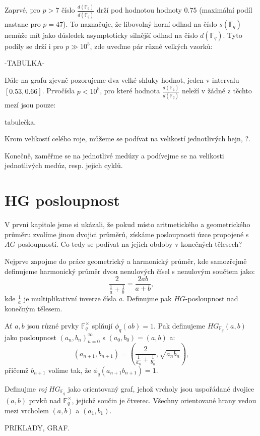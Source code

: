 \documentclass[12pt]{report}
\begin{document}
Zaprvé, pro $p>7$ číslo $\frac{d(\mathbb{F_q})}{d(\mathbb{F}_q)}$ drží pod hodnotou hodnoty $0.75$ (maximální podíl nastane pro $p=47$). To naznačuje, že libovolný horní odhad na číslo $s(\mathbb{F}_q)$ nemůže mít jako důsledek asymptoticky silnější odhad na číslo $d(\mathbb{F}_q)$. Tyto podíly se drží i pro $p \gg 10^5$, zde uveďme pár různé velkých vzorků:

-TABULKA-

Dále na grafu zjevně pozorujeme dva velké shluky hodnot, jeden v intervalu $[0.53,0.66]$. Prvočísla $p<10^5$, pro které hodnota $\frac{d(\mathbb{F_q})}{d(\mathbb{F}_q)}$ neleží v žádné z těchto mezí jsou pouze:

tabulečka.


Krom velikostí celého roje, můžeme se podívat na velikostí jednotlivých hejn, ?.

Konečně, zaměřme se na jednotlivé medúzy a podívejme se na velikosti jednotlivých medúz, resp. jejich cyklů.

\section{HG posloupnost}


V první kapitole jsme si ukázali, že pokud místo aritmetického a geometrického průměru zvolíme jinou dvojici průměrů, získáme posloupnosti úzce propojené s $AG$ posloupností. Co tedy se podívat na jejich obdoby v konečných tělesech? 


Nejprve zapojme do práce geometrický a harmonický průměr, kde samozřejmě definujeme harmonický průměr dvou nenulových čísel s nenulovým součtem jako:
$$\frac{2}{\frac{1}{a}+\frac{1}{b}} = \frac{2ab}{a+b},$$
kde $\frac{1}{a}$ je multiplikativní inverze čísla $a$. Definujme pak $HG$-posloupnost nad konečným tělesem.


\begin{definice}
Ať $a,b$ jsou různé prvky $\mathbb{F}_q ^{\times}$ splňují $\phi_q (ab) = 1$. Pak definujeme $HG_{\mathbb{F}_q}(a,b)$ jako posloupnost $(a_n,b_n)_{n=0}^{\infty}$ s $(a_0,b_0) = (a,b)$ a:
\begin{equation*}
\left(a_{n+1},b_{n+1} \right) = \left(\frac{2}{\frac{1}{a_n} + \frac{1}{b_n}}, \sqrt{a_n b_n} \right),
\end{equation*}
přičemž $b_{n+1}$ volíme tak, že $\phi_q (a_{n+1} b_{n+1}) = 1$.
\end{definice}

\begin{definice}
Definujme \textit{roj} $HG_{\mathbb{F}_q}$ jako orientovaný graf, jehož vrcholy jsou uspořádané dvojice $(a,b)$ prvků nad $\mathbb{F}_q ^{\times}$, jejichž součin je čtverec. Všechny orientované hrany vedou mezi vrcholem $(a,b)$ a $(a_1,b_1)$.
\end{definice}
PRIKLADY, GRAF.
\end{document}

